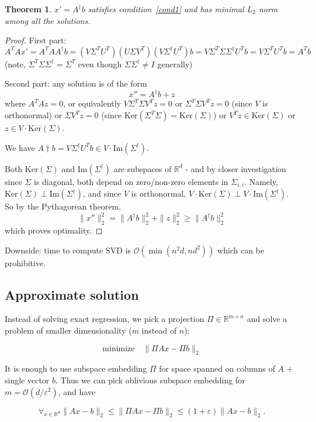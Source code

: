 \documentclass[11pt]{article}
\newtheorem{theorem}{Theorem}
\newcommand{\bigo}{\mathcal{O}}
\begin{document}
\begin{theorem}
$x' = A^\dagger b$ satisfies condition~\eqref{cond1} and has minimal $L_2$ norm among all the solutions.
\end{theorem}
\begin{proof}
First part:
$$A^TA x' = A^TA A^{\dagger} b = (V 
\Sigma^T U^T  ) (U \Sigma V^T) (V \Sigma^{\dagger} U^T) b = V \Sigma^T \Sigma \Sigma^\dagger U^T b = V \Sigma^T U^T b = A^T b$$
(note, $\Sigma^T \Sigma \Sigma^\dagger = \Sigma^T$ even though $\Sigma \Sigma^\dagger \not= I$ generally)

Second part:
any solution is of the form
$$x'' = A^\dagger b + z$$
where $A^TAz = 0$, or equivalently $V \Sigma^T \Sigma V^T z = 0$ or $\Sigma^T \Sigma V^T z = 0$ (since $V$ is orthonormal) or $\Sigma V^T z = 0$ (since $\textrm{Ker}(\Sigma^T \Sigma) = \textrm{Ker}(\Sigma)$) or $V^Tz \in \textrm{Ker}(\Sigma)$ or $z \in V \cdot \textrm{Ker}(\Sigma)$.

We have $A\dagger b = V \Sigma^\dagger U^T b \in V \cdot \textrm{Im}(\Sigma^\dagger)$.

Both $\textrm{Ker}(\Sigma)$ and $\textrm{Im}(\Sigma^{\dagger})$ are subspaces of $\mathbb{R}^{d}$ - and by closer investigation since $\Sigma$ is diagonal, both depend on zero/non-zero elements in $\Sigma_{i,i}$. Namely, $\textrm{Ker}(\Sigma) \perp \textrm{Im}(\Sigma^\dagger)$, and since $V$ is orthonormal, $V \cdot \textrm{Ker}(\Sigma) \perp V \cdot \textrm{Im}(\Sigma^\dagger)$. So by the Pythagorean theorem,
$$\|x''\|_2^2 = \|A^{\dagger} b\|_2^2 + \|z\|_2^2 \ge  \|A^{\dagger} b\|_2^2$$
which proves optimality.
\end{proof}

Downside: time to compute SVD is $\bigo(\min(n^2d, nd^2))$ which can be prohibitive.

\subsection{Approximate solution}
Instead of solving exact regression, we pick a projection $\Pi \in \mathbb{R}^{m \times n}$ and solve a problem of smaller dimensionality ($m$ instead of $n$):

$$\textrm{minimize}\quad \|\Pi A x - \Pi b\|_2$$

It is enough to use subspace embedding $\Pi$ for space spanned on columns of $A$  + single vector $b$. Thus we can pick oblivious subspace embedding for $m = \bigo(d/\varepsilon^2)$, and have

$$\forall_{x \in \mathbb{R}^d} \|A x - b\|_2 \le \|\Pi A x - \Pi b\|_2 \le (1+\varepsilon) \| A x - b\|_2.$$
\end{document}

